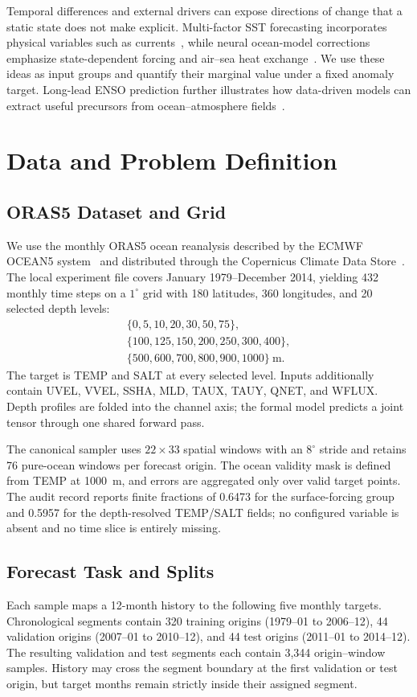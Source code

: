 \documentclass[conference]{IEEEtran}
\begin{document}
Temporal differences and external drivers can expose directions of change that a static state does not make explicit. Multi-factor SST forecasting incorporates physical variables such as currents~\cite{yangMultiFactorDeepLearning2025}, while neural ocean-model corrections emphasize state-dependent forcing and air--sea heat exchange~\cite{stortoCorrectionSeaSurface2025}. We use these ideas as input groups and quantify their marginal value under a fixed anomaly target. Long-lead ENSO prediction further illustrates how data-driven models can extract useful precursors from ocean--atmosphere fields~\cite{hamDeepLearningMultiyear2019}.

\section{Data and Problem Definition}

\subsection{ORAS5 Dataset and Grid}
We use the monthly ORAS5 ocean reanalysis described by the ECMWF OCEAN5 system~\cite{zuo2019ocean5} and distributed through the Copernicus Climate Data Store~\cite{copernicus2021oras5}. The local experiment file covers January 1979--December 2014, yielding 432 monthly time steps on a $1^\circ$ grid with 180 latitudes, 360 longitudes, and 20 selected depth levels:
\[
\begin{gathered}
\{0,5,10,20,30,50,75\},\\
\{100,125,150,200,250,300,400\},\\
\{500,600,700,800,900,1000\}\ \mathrm{m}.
\end{gathered}
\]
The target is TEMP and SALT at every selected level. Inputs additionally contain UVEL, VVEL, SSHA, MLD, TAUX, TAUY, QNET, and WFLUX. Depth profiles are folded into the channel axis; the formal model predicts a joint tensor through one shared forward pass.

The canonical sampler uses $22\times33$ spatial windows with an $8^\circ$ stride and retains 76 pure-ocean windows per forecast origin. The ocean validity mask is defined from TEMP at 1000~m, and errors are aggregated only over valid target points. The audit record reports finite fractions of 0.6473 for the surface-forcing group and 0.5957 for the depth-resolved TEMP/SALT fields; no configured variable is absent and no time slice is entirely missing.

\subsection{Forecast Task and Splits}
Each sample maps a 12-month history to the following five monthly targets. Chronological segments contain 320 training origins (1979--01 to 2006--12), 44 validation origins (2007--01 to 2010--12), and 44 test origins (2011--01 to 2014--12). The resulting validation and test segments each contain 3,344 origin--window samples. History may cross the segment boundary at the first validation or test origin, but target months remain strictly inside their assigned segment.
\end{document}
